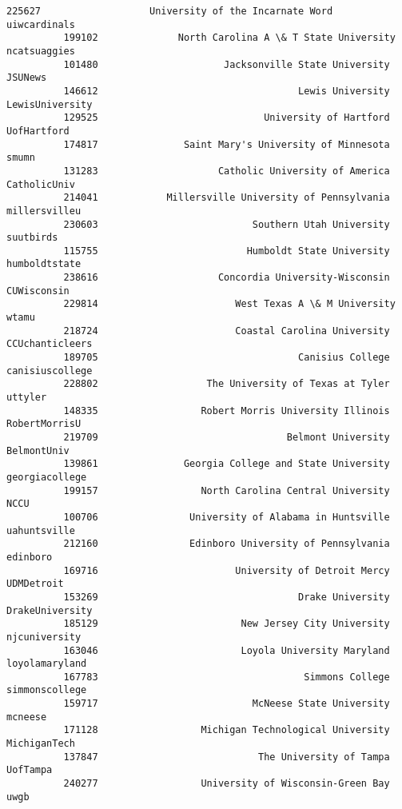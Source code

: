\documentclass[11pt]{article}
\begin{document}
\begin{Verbatim}[commandchars=\\\{\}]
          225627                   University of the Incarnate Word     uiwcardinals   
          199102              North Carolina A \& T State University     ncatsuaggies   
          101480                      Jacksonville State University          JSUNews   
          146612                                   Lewis University  LewisUniversity   
          129525                             University of Hartford      UofHartford   
          174817               Saint Mary's University of Minnesota            smumn   
          131283                     Catholic University of America     CatholicUniv   
          214041            Millersville University of Pennsylvania    millersvilleu   
          230603                           Southern Utah University        suutbirds   
          115755                          Humboldt State University    humboldtstate   
          238616                     Concordia University-Wisconsin      CUWisconsin   
          229814                        West Texas A \& M University            wtamu   
          218724                        Coastal Carolina University  CCUchanticleers   
          189705                                   Canisius College  canisiuscollege   
          228802                   The University of Texas at Tyler          uttyler   
          148335                  Robert Morris University Illinois    RobertMorrisU   
          219709                                 Belmont University      BelmontUniv   
          139861               Georgia College and State University   georgiacollege   
          199157                  North Carolina Central University             NCCU   
          100706                University of Alabama in Huntsville     uahuntsville   
          212160                Edinboro University of Pennsylvania         edinboro   
          169716                        University of Detroit Mercy       UDMDetroit   
          153269                                   Drake University  DrakeUniversity   
          185129                         New Jersey City University    njcuniversity   
          163046                         Loyola University Maryland   loyolamaryland   
          167783                                    Simmons College   simmonscollege   
          159717                           McNeese State University          mcneese   
          171128                  Michigan Technological University     MichiganTech   
          137847                            The University of Tampa         UofTampa   
          240277                  University of Wisconsin-Green Bay             uwgb   

\end{Verbatim}
\end{document}

